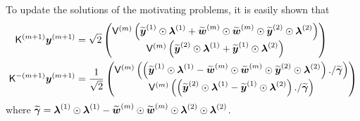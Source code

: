 \documentclass[acmsmall]{acmart}
\begin{document}
To update the solutions of the motivating problems, it is easily shown that  
\begin{align*}
    \mK^{(m+1)} \by^{(m+1)} 
    &= \sqrt{2} \begin{pmatrix} \mV^{(m)} \left(\tby^{(1)} \odot \blambda^{(1)} + \tbw^{(m)} \odot \tbw^{(m)} \odot \tby^{(2)} \odot \blambda^{(2)} \right) \\ \mV^{(m)} \left(\tby^{(2)} \odot \blambda^{(1)} + \tby^{(1)} \odot \blambda^{(2)} \right)\end{pmatrix} \\
    \mK^{-(m+1)} \by^{(m+1)} 
    &= \frac{1}{\sqrt{2}} \begin{pmatrix} \mV^{(m)} \left(\left(\tby^{(1)} \odot \blambda^{(1)} - \tbw^{(m)} \odot \tbw^{(m)} \odot \tby^{(2)} \odot \blambda^{(2)} \right) ./ \tbgamma\right) \\ \mV^{(m)}\left( \left( \tby^{(2)} \odot \blambda^{(1)} - \tby^{(1)} \odot \blambda^{(2)} \right) ./ \tbgamma \right)\end{pmatrix}
\end{align*}
where $\tbgamma = \blambda^{(1)} \odot \blambda^{(1)} - \tbw^{(m)} \odot \tbw^{(m)} \odot \blambda^{(2)} \odot \blambda^{(2)}$. 


\begin{listing}[H]
    \inputminted{python}{snippets/si_lattice_1.txt}
    \caption{Efficient Gram matrix multiplication and inversion when pairing a lattice point set with a shift invariant kernel.}
    \label{code:si_lattice_1}
\end{listing}
\end{document}
